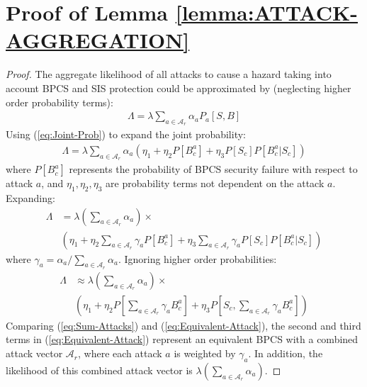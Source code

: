 \documentclass[journal]{IEEEtran}
\begin{document}
\appendices

\section{Proof of Lemma \ref{lemma:ATTACK-AGGREGATION}} \label{app:lemma-proof}
\begin{proof}
The aggregate likelihood of all attacks to cause a hazard taking into account BPCS and SIS protection could be approximated by (neglecting higher order probability terms):
\begin{align}
 \Lambda = \lambda \sum_{a \in \mathcal{A}_r} \alpha_a P_a[S,B]
\end{align}
Using (\ref{eq:Joint-Prob}) to expand the joint probability:
\begin{align}
\Lambda = \lambda \sum_{a \in \mathcal{A}_r}  \alpha_a \left( \eta_1 + \eta_2 P[B^a_c] + \eta_3 P[S_c] P[B^a_c | S_c] \right)
\label{eq:Sum-Attacks}
\end{align}
where $P[B^a_c]$ represents the probability of BPCS security failure with respect to attack $a$, and $\eta_1, \eta_2, \eta_3$ are probability terms not dependent on the attack $a$. Expanding:
\begin{align}
\Lambda &= \lambda \left( \sum_{a \in \mathcal{A}_r} \alpha_a \right) \times \\
& \left( \eta_1 + \eta_2 \sum_{a \in \mathcal{A}_r} \gamma_a P[B^a_c] + \eta_3 \sum_{a \in \mathcal{A}_r} \gamma_a P[S_c] P[B^a_c | S_c] \right)
\end{align}
where $\gamma_a = \alpha_a / \sum_{a \in \mathcal{A}_r} \alpha_a$. Ignoring higher order probabilities:
\begin{align}
\Lambda &\approx \lambda \left( \sum_{a \in \mathcal{A}_r} \alpha_a \right) \times \\
& \left( \eta_1 + \eta_2 P \left[ \sum_{a \in \mathcal{A}_r} \gamma_a B^a_c \right] + \eta_3 P \left[ S_c, \sum_{a \in \mathcal{A}_r} \gamma_a B^a_c \right] \right)
\label{eq:Equivalent-Attack}
\end{align}
Comparing (\ref{eq:Sum-Attacks}) and (\ref{eq:Equivalent-Attack}), the second and third terms in (\ref{eq:Equivalent-Attack}) represent an equivalent BPCS with a combined attack vector $\mathcal{A}_r$, where each attack $a$ is weighted by $\gamma_a$. In addition, the likelihood of this combined attack vector is $\lambda \left( \sum_{a \in \mathcal{A}_r} \alpha_a \right)$.
\end{proof}
\end{document}
